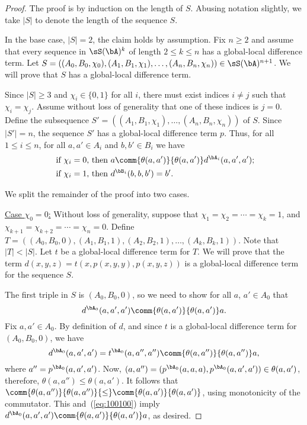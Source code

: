 \begin{proof}
The proof is by induction on the length of $S$. Abusing notation slightly, we
take $|S|$ to denote the length of the sequence $S$.

In the base case, $|S| = 2$, the claim holds by assumption.
Fix $n\geq 2$ and assume that every sequence in $\sS(\bA)^k$ of length $2\leq k \leq n$ has
a global-local difference term. Let
$S = ((A_0, B_0, \chi_0), (A_1, B_1, \chi_1), \dots, (A_{n}, B_{n},\chi_{n})) \in \sS(\bA)^{n+1}$.
We will prove that $S$ has a global-local difference term.

Since $|S| \geq 3$ and $\chi_i \in \{0,1\}$ for all $i$, there must exist
indices $i\neq j$ such that $\chi_i = \chi_j$. Assume without loss of generality
that one of these indices is $j=0$.  Define the subsequence
$S' = ((A_1, B_1, \chi_1), \dots,(A_{n}, B_{n},\chi_{n}))$ of $S$. %
Since $|S'| = n$, the sequence $S'$ has a global-local difference term $p$.
Thus, for all $1\leq i \leq n$,
for all $a, a'\in A_i$ and $b, b' \in B_i$ we have
\begin{align*}
  \text{ if $\chi_i=0$, then } &
  a \comm{\theta(a,a')}{\theta(a,a')} d^{\bA_i}(a,a',a');\\
  \text{ if $\chi_i=1$, then } &
  d^{\bB_i}(b,b,b') = b'.
\end{align*}

We split the remainder of the proof into two cases.%

\vskip3mm

\noindent \underline{Case $\chi_0 = 0$:}
Without loss of generality, suppose that
$\chi_1 = \chi_2 = \cdots =\chi_k = 1$,
and
$\chi_{k+1} = \chi_{k+2} = \cdots = \chi_{n} = 0$.
Define
$T = ((A_0, B_0, 0), (A_1, B_1, 1), (A_2, B_2, 1), \dots, (A_k, B_k, 1))$.
Note that $|T| < |S|$.
Let $t$ be a global-local difference term for $T$.
We will prove that the term $d(x,y,z) = t(x, p(x,y,y), p(x,y,z))$
is a global-local difference term for the sequence $S$.

The first triple in $S$ is $(A_0, B_0, 0)$, so we need to show for all $a$, $a' \in A_0$
that
\[
d^{\bA_0}(a,a',a') \comm{\theta(a,a')}{\theta(a,a')} a.
\]
Fix $a, a' \in A_0$.
By definition of $d$, and since
$t$ is a global-local difference term for $(A_0, B_0,0)$, we have
\begin{equation}
  \label{eq:100100}
  d^{\bA_0}(a,a',a') 
  =t^{\bA_0}(a, a'', a'')\comm{\theta(a, a'')}{\theta(a, a'')} a,
\end{equation}
where $a'' = p^{\bA_0}(a,a',a')$.
Now,
$(a, a'') = (p^{\bA_0}(a,a,a), p^{\bA_0}(a,a',a')) \in \theta(a, a')$, therefore,
$\theta(a, a'') \leq \theta(a,a')$. It follows that
$\comm{\theta(a, a'')}{\theta(a, a'')} {\leq} \comm{\theta(a,a')}{\theta(a,a')}$,
using monotonicity of the commutator.
This and~(\ref{eq:100100}) imply
$d^{\bA_0}(a,a',a')\comm{\theta(a,a')}{\theta(a,a')} a$,
as desired.


\end{proof}
